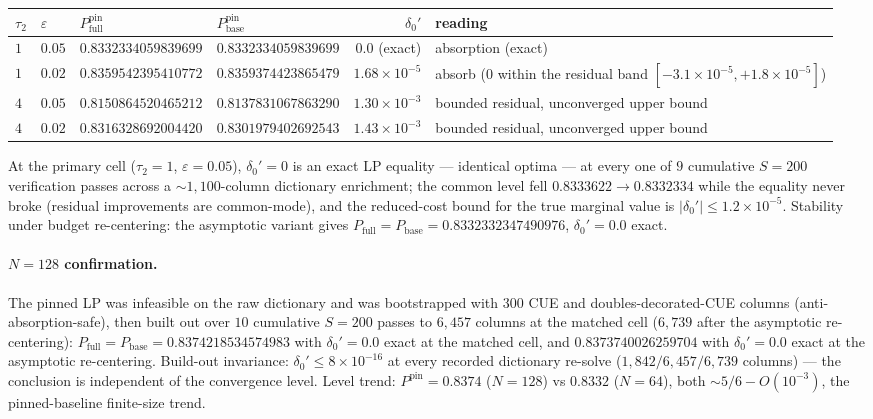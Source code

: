 \documentclass[11pt]{article}
\theoremstyle{plain}
\theoremstyle{definition}
\theoremstyle{remark}
\begin{document}
\begin{table}[h]
\centering
\small
\begin{tabular}{@{}llllr >{\raggedright\arraybackslash}p{4.3cm}@{}}
\toprule
$\tau_2$ & $\varepsilon$ & $P_{\mathrm{full}}^{\mathrm{pin}}$ &
$P_{\mathrm{base}}^{\mathrm{pin}}$ & $\delta_0'$ & reading \\
\midrule
$1$ & $0.05$ & $0.8332334059839699$ & $0.8332334059839699$ &
$\mathbf{0.0}$ (exact) & absorption (exact) \\
\addlinespace
$1$ & $0.02$ & $0.8359542395410772$ & $0.8359374423865479$ &
$1.68 \times 10^{-5}$ &
absorb ($0$ within the residual band
$[-3.1 \times 10^{-5}, +1.8 \times 10^{-5}]$) \\
\addlinespace
$4$ & $0.05$ & $0.8150864520465212$ & $0.8137831067863290$ &
$1.30 \times 10^{-3}$ & bounded residual, unconverged upper bound \\
\addlinespace
$4$ & $0.02$ & $0.8316328692004420$ & $0.8301979402692543$ &
$1.43 \times 10^{-3}$ & bounded residual, unconverged upper bound \\
\bottomrule
\end{tabular}
\end{table}

At the primary cell ($\tau_2 = 1$,
$\varepsilon = 0.05$), $\delta_0' = 0$ is an exact LP equality --- identical
optima --- at every one of $9$ cumulative $S = 200$ verification passes across a
${\sim}1{,}100$-column dictionary enrichment; the common level fell
$0.8333622 \to 0.8332334$ while the equality never broke (residual improvements
are common-mode), and the reduced-cost bound for the true marginal value is
$|\delta_0'| \le 1.2 \times 10^{-5}$. Stability under budget re-centering: the
asymptotic variant gives
$P_{\mathrm{full}} = P_{\mathrm{base}} = 0.8332332347490976$,
$\delta_0' = 0.0$ exact.

\paragraph{$N = 128$ confirmation.}
The pinned LP was infeasible on the raw dictionary and was bootstrapped with
$300$ CUE and doubles-decorated-CUE columns (anti-absorption-safe), then built
out over $10$ cumulative $S = 200$ passes to $6{,}457$ columns at the matched
cell ($6{,}739$ after the asymptotic re-centering):
$P_{\mathrm{full}} = P_{\mathrm{base}} = 0.8374218534574983$ with
$\delta_0' = 0.0$ exact at the matched cell, and $0.8373740026259704$ with
$\delta_0' = 0.0$ exact at the asymptotic re-centering. Build-out invariance:
$\delta_0' \le 8 \times 10^{-16}$ at every recorded dictionary re-solve
($1{,}842 / 6{,}457 / 6{,}739$ columns) --- the conclusion is independent of the
convergence level. Level trend: $P^{\mathrm{pin}} = 0.8374$ ($N = 128$) vs
$0.8332$ ($N = 64$), both ${\sim}5/6 - O(10^{-3})$, the pinned-baseline
finite-size trend.
\end{document}

